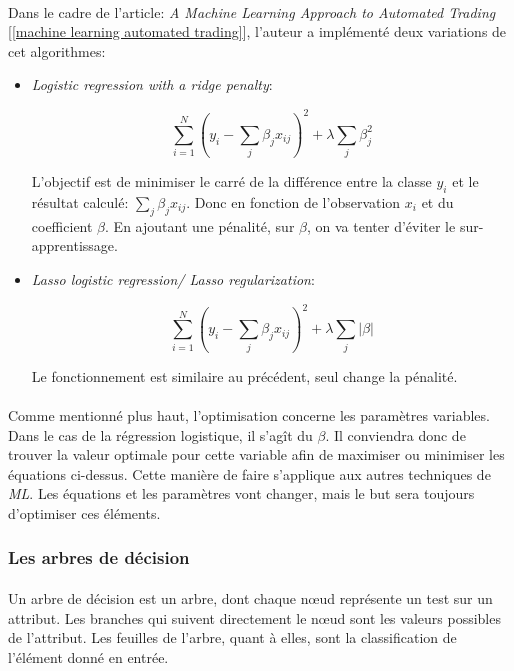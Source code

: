 \documentclass[a4paper, 11pt]{article}
\begin{document}
\paragraph{}
Dans le cadre de l'article: \textit{A Machine Learning Approach to Automated Trading} [\ref{machine learning automated trading}], l'auteur a implémenté deux variations de cet algorithmes:
\begin{itemize}
\item \textit{Logistic regression with a ridge penalty}:
\begin{center}
$$\sum_{i=1}^N (y_i - \sum_j\beta_j x_{ij})^2 + \lambda \sum_j \beta_j^2$$
\end{center}
L'objectif est de minimiser le carré de la différence entre la classe $y_i$ et le résultat calculé: $\sum\limits_j\beta_j x_{ij}$. Donc en fonction de l'observation $x_i$ et du coefficient $\beta$. En ajoutant une pénalité, sur $\beta$, on va tenter d'éviter le sur-apprentissage.

\item \textit{Lasso logistic regression/ Lasso regularization}:
\begin{center}
$$\sum_{i=1}^N (y_i - \sum_j\beta_j x_{ij})^2 + \lambda \sum_j |\beta|$$
\end{center}
Le fonctionnement est similaire au précédent, seul change la pénalité.
\end{itemize}

\paragraph{}
Comme mentionné plus haut, l'optimisation concerne les paramètres variables. Dans le cas de la régression logistique, il s'agît du $\beta$. Il conviendra donc de trouver la valeur optimale pour cette variable afin de maximiser ou minimiser les équations ci-dessus. Cette manière de faire s'applique aux autres techniques de \textit{ML}. Les équations et les paramètres vont changer, mais  le but sera toujours d'optimiser ces éléments. 

\subsubsection{Les arbres de décision}

\paragraph{}
Un arbre de décision est un arbre, dont chaque nœud représente un test sur un attribut. Les branches qui suivent directement le nœud sont les valeurs possibles de l'attribut. Les feuilles de l'arbre, quant à elles, sont la classification de l'élément donné en entrée.
\end{document}
